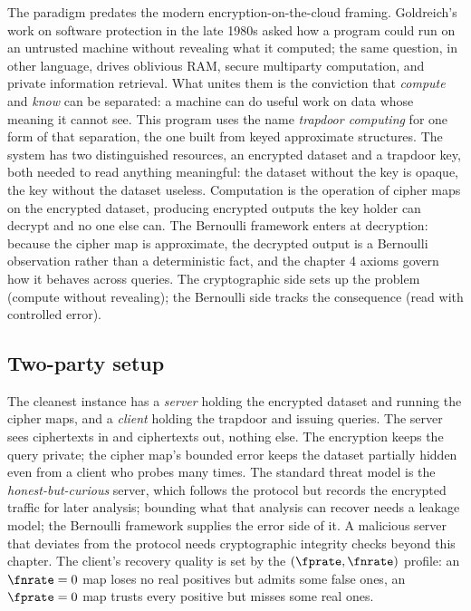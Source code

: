 The paradigm predates the modern encryption-on-the-cloud framing.
Goldreich's work on software protection in the late 1980s asked how a
program could run on an untrusted machine without revealing what it
computed; the same question, in other language, drives oblivious RAM,
secure multiparty computation, and private information retrieval. What unites them is the
conviction that \emph{compute} and \emph{know} can be
separated: a machine can do useful work on data whose meaning it cannot
see. This program uses the name \emph{trapdoor computing}
for one form of that separation, the one built from keyed approximate
structures. The system has two
distinguished resources, an encrypted dataset and a trapdoor key, both
needed to read anything meaningful: the dataset without the key is opaque,
the key without the dataset useless. Computation is the operation of
cipher maps on the encrypted dataset, producing encrypted outputs the key
holder can decrypt and no one else can. The Bernoulli framework enters at
decryption: because the cipher map is approximate, the decrypted output
is a Bernoulli observation rather than a deterministic fact, and the
chapter 4 axioms govern how it behaves across queries. The cryptographic
side sets up the problem (compute without revealing); the Bernoulli side
tracks the consequence (read with controlled error).

\subsection*{Two-party setup}

The cleanest instance has a \emph{server} holding the encrypted dataset
and running the cipher maps, and a \emph{client} holding the trapdoor and
issuing queries. The server sees ciphertexts in and ciphertexts out,
nothing else. The encryption keeps the query private; the cipher map's
bounded error keeps the dataset partially hidden even from a client who
probes many times. The standard threat model is the
\emph{honest-but-curious} server, which follows the protocol but records
the encrypted traffic for later analysis; bounding what that analysis can
recover needs a leakage model; the Bernoulli framework supplies the error
side of it. A malicious server that deviates
from the protocol needs cryptographic integrity checks beyond this
chapter. The client's recovery quality is set by the $(\fprate, \fnrate)$
profile: an $\fnrate = 0$ map loses no real positives but admits some
false ones, an $\fprate = 0$ map trusts every positive but misses some
real ones.


